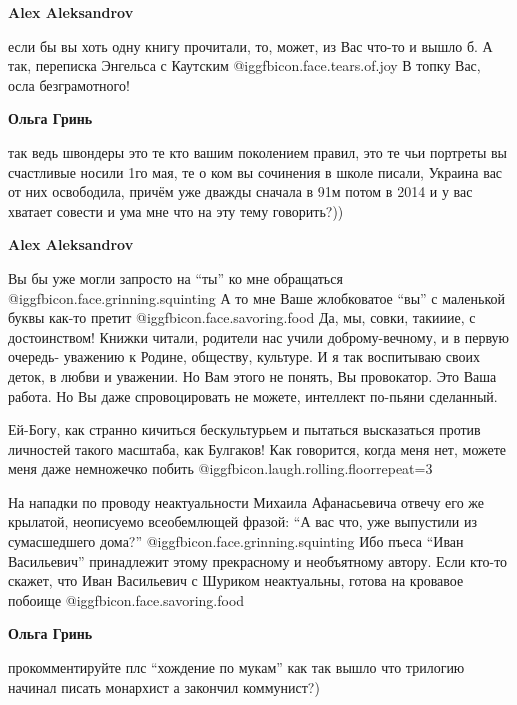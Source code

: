\begin{itemize}
\begin{itemize}
\begin{itemize}
\textbf{Alex Aleksandrov} 

если бы вы хоть одну книгу прочитали, то, может, из Вас что-то и вышло б. А
так, переписка Энгельса с Каутским @igg{fbicon.face.tears.of.joy}  В топку Вас,
осла безграмотного!

\textbf{Ольга Гринь} 

так ведь швондеры это те кто вашим поколением правил, это те чьи портреты вы
счастливые носили 1го мая, те о ком вы сочинения в школе писали, Украина вас от
них освободила, причём уже дважды сначала в 91м потом в 2014 и у вас хватает
совести и ума мне что на эту тему говорить?))

\textbf{Alex Aleksandrov} 

Вы бы уже могли запросто на \enquote{ты} ко мне обращаться
@igg{fbicon.face.grinning.squinting}  А то мне Ваше жлобковатое \enquote{вы} с
маленькой буквы как-то претит @igg{fbicon.face.savoring.food}  Да, мы, совки,
такииие, с достоинством!  Книжки читали, родители нас учили доброму-вечному, и
в первую очередь- уважению к Родине, обществу, культуре. И я так воспитываю
своих деток, в любви и уважении. Но Вам этого не понять, Вы провокатор. Это
Ваша работа. Но Вы даже спровоцировать не можете, интеллект по-пьяни сделанный.

\end{itemize} %


Ей-Богу, как странно кичиться бескультурьем и пытаться высказаться против
личностей такого масштаба, как Булгаков! Как говорится, когда меня нет, можете
меня даже немножечко побить @igg{fbicon.laugh.rolling.floor}{repeat=3} 

На нападки по проводу неактуальности Михаила Афанасьевича отвечу его же
крылатой, неописуемо всеобемлющей фразой: \enquote{А вас что, уже выпустили из
сумасшедшего дома?} @igg{fbicon.face.grinning.squinting}  Ибо пъеса
\enquote{Иван Васильевич} принадлежит этому прекрасному и необъятному автору.
Если кто-то скажет, что Иван Васильевич с Шуриком неактуальны, готова на
кровавое побоище @igg{fbicon.face.savoring.food} 

\begin{itemize} %
\textbf{Ольга Гринь} 

прокомментируйте плс \enquote{хождение по мукам} как так вышло что трилогию начинал
писать монархист а закончил коммунист?)


\end{itemize}
\end{itemize}
\end{itemize}
